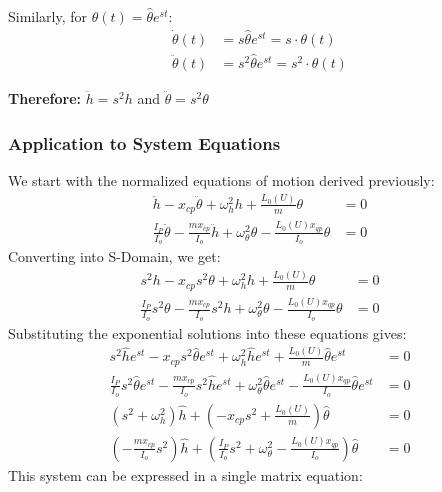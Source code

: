 \documentclass{article}
\begin{document}
\noindent Similarly, for $\theta(t) = \hat{\theta} e^{st}$:
\begin{align}
\dot{\theta}(t) &= s \hat{\theta} e^{st} = s \cdot \theta(t) \\
\ddot{\theta}(t) &= s^2 \hat{\theta} e^{st} = s^2 \cdot \theta(t)
\end{align}

\noindent\textbf{Therefore:} $\ddot{h} = s^2 h$ and $\ddot{\theta} = s^2 \theta$

\subsubsection{Application to System Equations}

We start with the normalized equations of motion derived previously: 
\begin{align}
\ddot{h} - x_{cp} \ddot{\theta} + \omega_h^2 h + \frac{L_0(U)}{m} \theta &= 0 \label{eq:system_plunge} \\
\frac{I_P}{I_o} \ddot{\theta} - \frac{m x_{cp}}{I_o} \ddot{h} + \omega_\theta^2 \theta - \frac{L_0(U) x_{qp}}{I_o} \theta &= 0 \label{eq:system_pitch}
\end{align}
Converting into S-Domain, we get:
\begin{align}
s^2 h - x_{cp} s^2 \theta + \omega_h^2 h + \frac{L_0(U)}{m} \theta &= 0 \label{eq:system_plunge} \\%
\frac{I_P}{I_o} s^2 \theta - \frac{m x_{cp}}{I_o} s^2 h + \omega_\theta^2 \theta - \frac{L_0(U) x_{qp}}{I_o} \theta &= 0 \label{eq:system_pitch}%
\end{align}
Substituting the exponential solutions into these equations gives:
\begin{align}
s^2 \hat{h}e^{st} - x_{cp} s^2 \hat{\theta}e^{st} + \omega_h^2 \hat{h}e^{st} + \frac{L_0(U)}{m} \hat{\theta}e^{st} &= 0 \label{eq:substitution_plunge} \\
\frac{I_P}{I_o} s^2 \hat{\theta}e^{st} - \frac{m x_{cp}}{I_o} s^2 \hat{h}e^{st} + \omega_\theta^2 \hat{\theta}e^{st} - \frac{L_0(U) x_{qp}}{I_o} \hat{\theta}e^{st} &= 0 \label{eq:substitution_pitch} \\
(s^2 + \omega_h^2)\hat{h} + (-x_{cp}s^2 + \frac{L_0(U)}{m})\hat{\theta} &= 0 \label{eq:coefficient_plunge} \\
(-\frac{m x_{cp}}{I_o}s^2)\hat{h} + (\frac{I_P}{I_o}s^2 + \omega_\theta^2 - \frac{L_0(U)x_{qp}}{I_o})\hat{\theta} &= 0 \label{eq:coefficient_pitch}
\end{align}
This system can be expressed in a single matrix equation:
\end{document}
